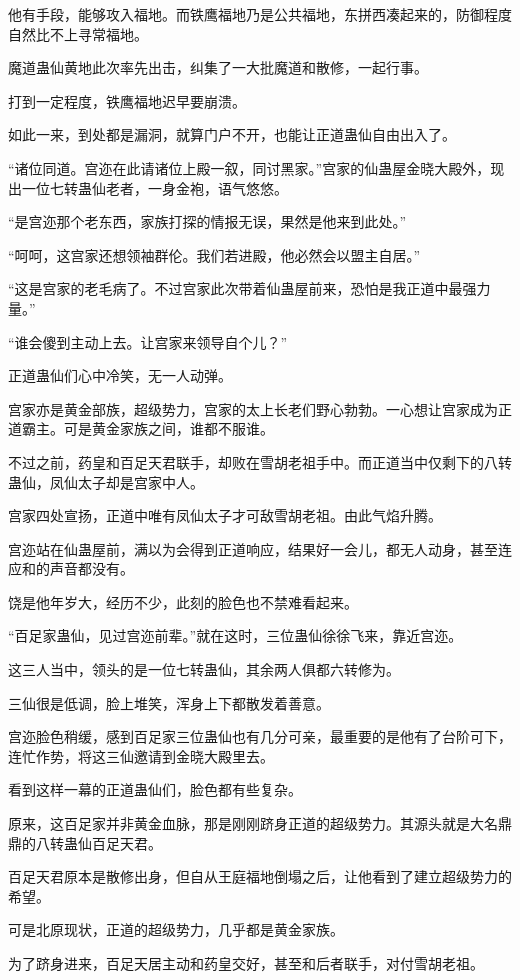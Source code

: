 \begin{this_body}
他有手段，能够攻入福地。而铁鹰福地乃是公共福地，东拼西凑起来的，防御程度自然比不上寻常福地。

魔道蛊仙黄地此次率先出击，纠集了一大批魔道和散修，一起行事。

打到一定程度，铁鹰福地迟早要崩溃。

如此一来，到处都是漏洞，就算门户不开，也能让正道蛊仙自由出入了。

“诸位同道。宫迩在此请诸位上殿一叙，同讨黑家。”宫家的仙蛊屋金晓大殿外，现出一位七转蛊仙老者，一身金袍，语气悠悠。

“是宫迩那个老东西，家族打探的情报无误，果然是他来到此处。”

“呵呵，这宫家还想领袖群伦。我们若进殿，他必然会以盟主自居。”

“这是宫家的老毛病了。不过宫家此次带着仙蛊屋前来，恐怕是我正道中最强力量。”

“谁会傻到主动上去。让宫家来领导自个儿？”

正道蛊仙们心中冷笑，无一人动弹。

宫家亦是黄金部族，超级势力，宫家的太上长老们野心勃勃。一心想让宫家成为正道霸主。可是黄金家族之间，谁都不服谁。

不过之前，药皇和百足天君联手，却败在雪胡老祖手中。而正道当中仅剩下的八转蛊仙，凤仙太子却是宫家中人。

宫家四处宣扬，正道中唯有凤仙太子才可敌雪胡老祖。由此气焰升腾。

宫迩站在仙蛊屋前，满以为会得到正道响应，结果好一会儿，都无人动身，甚至连应和的声音都没有。

饶是他年岁大，经历不少，此刻的脸色也不禁难看起来。

“百足家蛊仙，见过宫迩前辈。”就在这时，三位蛊仙徐徐飞来，靠近宫迩。

这三人当中，领头的是一位七转蛊仙，其余两人俱都六转修为。

三仙很是低调，脸上堆笑，浑身上下都散发着善意。

宫迩脸色稍缓，感到百足家三位蛊仙也有几分可亲，最重要的是他有了台阶可下，连忙作势，将这三仙邀请到金晓大殿里去。

看到这样一幕的正道蛊仙们，脸色都有些复杂。

原来，这百足家并非黄金血脉，那是刚刚跻身正道的超级势力。其源头就是大名鼎鼎的八转蛊仙百足天君。

百足天君原本是散修出身，但自从王庭福地倒塌之后，让他看到了建立超级势力的希望。

可是北原现状，正道的超级势力，几乎都是黄金家族。

为了跻身进来，百足天居主动和药皇交好，甚至和后者联手，对付雪胡老祖。


\end{this_body}
